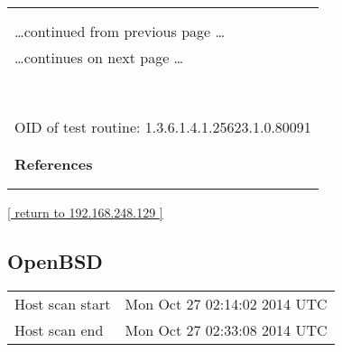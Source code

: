 \documentclass{article}
\begin{document}
\begin{longtable}{|p{}|}
\hline
\rowcolor{openvas_warning}{\color{white}{Medium (CVSS: 2.6) }}\\
\rowcolor{openvas_warning}{\color{white}{NVT: TCP timestamps}}\\
\hline
\endfirsthead
\hfill\ldots continued from previous page \ldots \\
\hline
\endhead
\hline
\ldots continues on next page \ldots \\
\endfoot
\hline
\endlastfoot
\\
\rowcolor{white}{\verb=It was detected that the host implements RFC1323.=}\\
\rowcolor{white}{\verb=The following timestamps were retrieved with a delay of 1 seconds in-between:=}\\
\rowcolor{white}{\verb=Paket 1: 1776245=}\\
\rowcolor{white}{\verb=Paket 2: 1776498=}\\
\rowcolor{white}{\verb==}\\
\rowcolor{white}{\verb==}\\
\\
OID of test routine: 1.3.6.1.4.1.25623.1.0.80091\\
\\

      \hline
      \\
\textbf{References}\\
\rowcolor{white}{\verb=Other:=}\\
\rowcolor{white}{\verb=  URL:http://www.ietf.org/rfc/rfc1323.txt=}\\
\end{longtable}

\begin{footnotesize}\hyperref[host:192.168.248.129]{[ return to 192.168.248.129 ]}\end{footnotesize}
\subsection{OpenBSD}
\label{host:192.168.248.130}

\begin{tabular}{ll}
Host scan start&Mon Oct 27 02:14:02 2014 UTC\\
Host scan end&Mon Oct 27 02:33:08 2014 UTC\\
\end{tabular}
\end{document}
